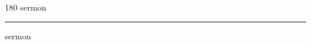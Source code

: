 
\begin{frame}
\begin{center}
\begin{turn}{180}
{\fontsize{2.5cm}{1em}\selectfont sermon}
\end{turn}
\vspace{1em}\par  
\hrule
\vspace{1em}\par  
{\fontsize{2.5cm}{1em}\selectfont sermon}
\end{center}
\end{frame}
